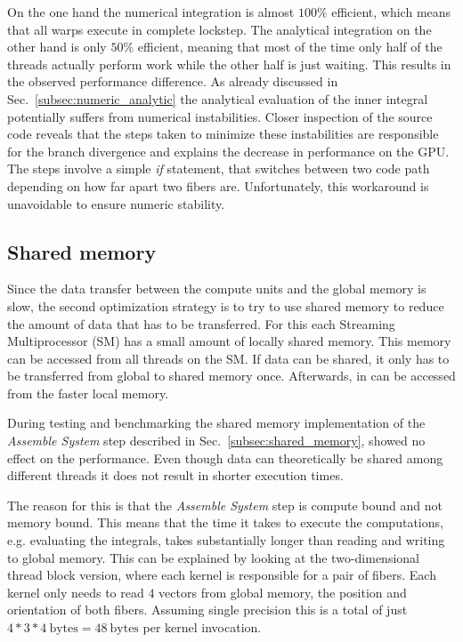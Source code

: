 On the one hand the numerical integration is almost $100\%$ efficient, which means that all warps execute in complete lockstep. The analytical integration on the other hand is only $50\%$ efficient, meaning that most of the time only half of the threads actually perform work while the other half is just waiting. This results in the observed performance difference. As already discussed in Sec.~\ref{subsec:numeric_analytic} the analytical evaluation of the inner integral potentially suffers from numerical instabilities. Closer inspection of the source code reveals that the steps taken to minimize these instabilities are responsible for the branch divergence and explains the decrease in performance on the GPU. The steps involve a simple \emph{if} statement, that switches between two code path depending on how far apart two fibers are. Unfortunately, this workaround is unavoidable to ensure numeric stability.

\subsection{Shared memory}
\label{subsec:bench_shared_memory}

Since the data transfer between the compute units and the global memory is slow, the second optimization strategy is to try to use shared memory to reduce the amount of data that has to be transferred. For this each Streaming Multiprocessor (SM) has a small amount of locally shared memory. This memory can be accessed from all threads on the SM. If data can be shared, it only has to be transferred from global to shared memory once. Afterwards, in can be accessed from the faster local memory.

During testing and benchmarking the shared memory implementation of the \emph{Assemble System} step described in Sec.~\ref{subsec:shared_memory}, showed no effect on the performance. Even though data can theoretically be shared among different threads it does not result in shorter execution times.

The reason for this is that the \emph{Assemble System} step is compute bound and not memory bound. This means that the time it takes to execute the computations, e.g. evaluating the integrals, takes substantially longer than reading and writing to global memory. This can be explained by looking at the two-dimensional thread block version, where each kernel is responsible for a pair of fibers. Each kernel only needs to read $4$ vectors from global memory, the position and orientation of both fibers. Assuming single precision this is a total of just $4 * 3 * 4~\text{bytes} = 48~\text{bytes}$ per kernel invocation.

